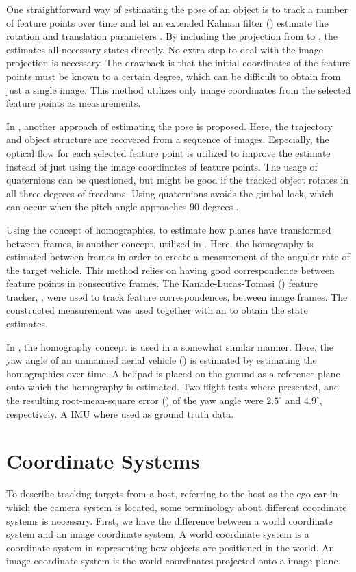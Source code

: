 One straightforward way of estimating the  pose of an object is to track a number of feature points over time and let an extended Kalman filter (\abbrEKF) estimate the rotation and translation parameters \cite{Hajimolahoseini:2014}.
By including the projection from  to , the \abbrEKF estimates all necessary states directly.
No extra step to deal with the image projection is necessary.
The drawback is that the initial  coordinates of the feature points must be known to a certain degree, which can be difficult to obtain from just a single image.
This method utilizes only image coordinates from the selected feature points as measurements.

In \cite{Blostein:2000}, another approach of estimating the  pose is proposed.
Here, the  trajectory and object structure are recovered from a sequence of images.
Especially, the optical flow for each selected feature point is utilized to improve the estimate instead of just using the image coordinates of feature points.
The usage of quaternions can be questioned, but might be good if the tracked object rotates in all three degrees of freedoms.
Using quaternions avoids the gimbal lock, which can occur when the pitch angle approaches 90 degrees \cite{Gustafsson:2012}.

Using the concept of homographies, \ie to estimate how planes have transformed between frames, is another concept, utilized in \cite{Gabb:2013}.
Here, the homography is estimated between frames in order to create a measurement of the angular rate of the target vehicle.
This method relies on having good correspondence between feature points in consecutive frames.
The Kanade-Lucas-Tomasi (\abbrKLT) feature tracker, \eg \cite{Szeliski:2011}, were used to track feature correspondences, between image frames.
The constructed measurement was used together with an \abbrEKF to obtain the state estimates.

In \cite{Mondragon:2010}, the homography concept is used in a somewhat similar manner.
Here, the yaw angle of an unmanned aerial vehicle (\abbrUAV) is estimated by estimating the homographies over time.
A helipad is placed on the ground as a reference plane onto which the homography is estimated.
Two flight tests where presented, and the resulting root-mean-square error (\abbrRMSE) of the yaw angle were $2.5^\circ$ and $4.9^\circ$, respectively.
A IMU where used as ground truth data.

\section{Coordinate Systems}
To describe tracking targets from a host, referring to the host as the ego car in which the camera system is located, some terminology about different coordinate systems is necessary.
First, we have the difference between a world coordinate system  and an image coordinate system.
A world coordinate system is a coordinate system in  representing how objects are positioned in the world.
An image coordinate system is the  world coordinates projected onto a  image plane.

